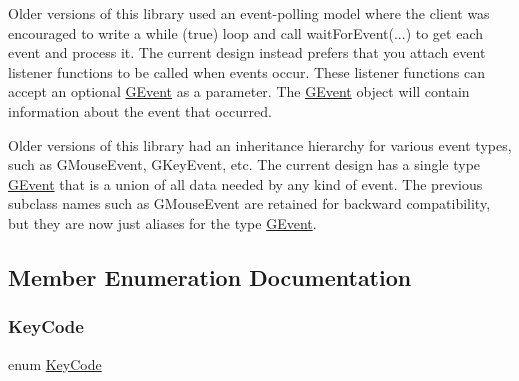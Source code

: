 Older versions of this library used an event-\/polling model where the client was encouraged to write a while (true) loop and call wait\+For\+Event(...) to get each event and process it. The current design instead prefers that you attach event listener functions to be called when events occur. These listener functions can accept an optional \mbox{\hyperlink{classGEvent}{G\+Event}} as a parameter. The \mbox{\hyperlink{classGEvent}{G\+Event}} object will contain information about the event that occurred.

Older versions of this library had an inheritance hierarchy for various event types, such as G\+Mouse\+Event, G\+Key\+Event, etc. The current design has a single type \mbox{\hyperlink{classGEvent}{G\+Event}} that is a union of all data needed by any kind of event. The previous subclass names such as G\+Mouse\+Event are retained for backward compatibility, but they are now just aliases for the type \mbox{\hyperlink{classGEvent}{G\+Event}}. 

\subsection{Member Enumeration Documentation}
\mbox{\label{classGEvent_a7885f47644a0388f981f416fa20389b2}} 
\subsubsection{\texorpdfstring{Key\+Code}{KeyCode}}
{\footnotesize\ttfamily enum \mbox{\hyperlink{classGEvent_a7885f47644a0388f981f416fa20389b2}{Key\+Code}}}


